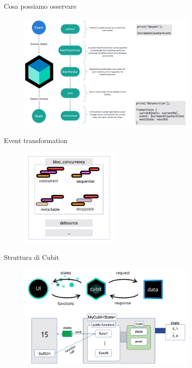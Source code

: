 \documentclass{../libs/presentation_format}
\begin{document}

\begin{frame}{Cosa possiamo osservare}
	\begin{figure}[htpb]
		\centering
		\includegraphics[width=9cm]{../libs/bloc-flow}
	\end{figure}
\end{frame}


\begin{frame}{Event transformation}
	\begin{figure}[htpb]
		\centering
		\includegraphics[width=5cm]{../libs/event-transformation}
	\end{figure}
\end{frame}


\begin{frame}{Struttura di Cubit}
	\begin{figure}[htpb]
		\centering
		\includegraphics[width=9cm]{../libs/cubit-structure}
	\end{figure}
\end{frame}
\end{document}
